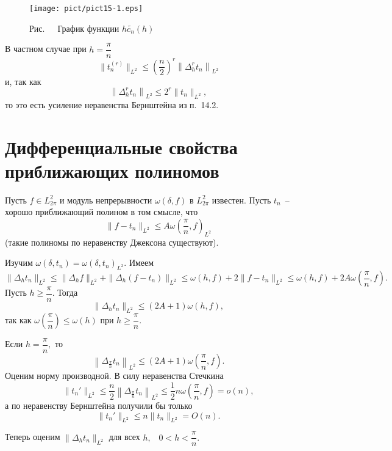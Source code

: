 \begin{figure}[ht]
\begin{center}
\texttt{[image: pict/pict15-1.eps]}
\end{center}

 \label{r15-1}
 \centerline{Рис.~\theris\ \ График функции $h\widetilde{c_n}(h)$}
\end{figure}


В частном случае при $h=\dfrac{\pi}{n}$
$$
\|t_n^{(r)}\|_{{L^2}}\le \left( \frac{n}{2}\right)^r \left\| \Delta_h^{r}t_n\right\|_{{L^2}}
$$
и, так как
$$
\left\| \Delta_h^{r} t_n\right\|_{{L^2}}\le 2^r \|t_n\|_{{L^2}},
$$
то это есть усиление неравенства Бернштейна из п.~14.2.


\section{Дифференциальные свойства приближающих полиномов}

Пусть  {$f\in L_{2\pi}^2$} и модуль непрерывности $\omega(\delta,f)$ {в $L_{2\pi}^2$} известен.
Пусть $t_n$~-- хорошо приближающий полином {в том смысле, что}
\begin{equation}\label{l15-tk2}
\|f-t_n\|_{{L^2}}\le A\omega\left(
\frac{\pi}{n},f\right)_{L^2}
\end{equation}
(такие полиномы по неравенству Джексона существуют).

Изучим $\omega(\delta,t_n)=\omega(\delta,t_n)_{L^2}.$ Имеем
$$
\|\Delta_h t_n\|_{{L^2}}\le \|\Delta_h f\|_{{L^2}}+\|\Delta_h
(f-t_n)\|_{L^2}\le \omega(h,f)+2\|f-t_n\|_{{L^2}}\le
\omega(h,f)+2A\omega\left(\frac{\pi}{n},f\right).
$$
Пусть $h\ge \dfrac{\pi}{n}.$ Тогда
$$
\|\Delta_h t_n\|_{{L^2}}\le (2A+1)\omega (h,f),
$$
так как $\omega\left( \dfrac{\pi}{n}\right) \le \omega(h)$ при $h\ge \dfrac{\pi}{n}.$

Если $h=\dfrac{\pi}{n},$ то
$$
\left\| \Delta_{\frac{\pi}{n}}t_n \right\|_{{L^2}}\le (2A+1)\omega\left(
\frac{\pi}{n},f\right).
$$
Оценим норму производной. В силу неравенства Стечкина
$$
\|t_n'\|_{{L^2}}\le \frac{n}{2}
\left\| \Delta_{\frac{\pi}{n}}t_n \right\|_{{L^2}}\le \frac12 n\omega \left(
\frac{\pi}{n},f\right)=o(n),
$$
а по неравенству Бернштейна получили бы только
$$
\|t_n'\|_{{L^2}}\le n\|t_n\|_{{L^2}}=O(n).
$$

Теперь оценим $\|\Delta_h t_n\|_{{L^2}}$ для всех $h,$~ $0<h<\dfrac{\pi}{n}.$

